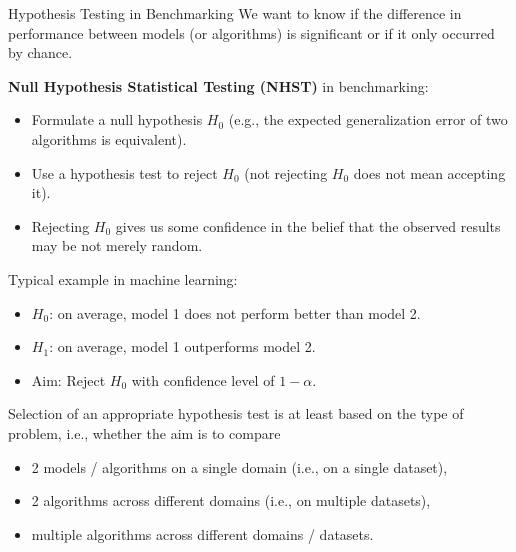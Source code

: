 \begin{vbframe}{Hypothesis Testing in Benchmarking}
We want to know if the difference in performance between models (or algorithms) is significant or if it only occurred by chance.

\lz
\textbf{Null Hypothesis Statistical Testing (NHST)} in benchmarking:

\begin{itemize}
\item Formulate a null hypothesis $H_0$ (e.g., the expected generalization error of two algorithms is equivalent).
\item Use a hypothesis test to reject $H_0$ (not rejecting $H_0$ does not mean accepting it).
\item Rejecting $H_0$ gives us some confidence in the belief that the observed results may be not merely random.
\end{itemize}

%
%
%

\lz Typical example in machine learning:

\begin{itemize}
\item $H_0$: on average, model 1 does not perform better than model 2.
\item $H_1$: on average, model 1 outperforms model 2.
\item Aim: Reject $H_0$ with confidence level of $1-\alpha$.
\end{itemize}

\framebreak

Selection of an appropriate hypothesis test is at least based on the type of problem, i.e., whether the aim is to compare
\begin{itemize}
\item 2 models / algorithms on a single domain (i.e., on a single dataset),
\item 2 algorithms across different domains (i.e., on multiple datasets),
\item multiple algorithms across different domains / datasets.
\end{itemize}


\end{vbframe}
